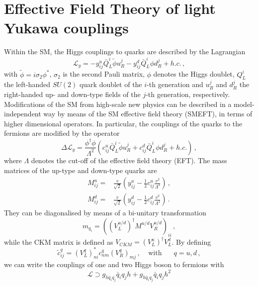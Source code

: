 \section{Effective Field Theory of light Yukawa couplings\label{sec:EFT}}
Within the SM, the Higgs couplings to quarks are described by the Lagrangian
\begin{equation}
	\mathcal{L}_{y}=-y^u_{ij} \bar{Q}_L^i \tilde{\phi} u_R^j - y^d_{ij} \bar{Q}_L^i \phi d_R^j +h.c.\,,
\end{equation}
with $\tilde{\phi}=i \sigma_2 \phi^*$, $\sigma_2$ is the second Pauli matrix, $\phi$ denotes the Higgs doublet, $Q_L^i$ the left-handed $SU(2)$ quark doublet of the $i$-th generation and $u_R^j$ and $d_R^j$ the right-handed up- and down-type fields of the $j$-th generation, respectively.
Modifications of the SM from high-scale new physics can be described in a model-independent way by means of the SM effective field theory (SMEFT), in terms of higher dimensional operators.  In particular, the couplings of the quarks to the fermions are modified by the operator
\begin{equation}
	\Delta \mathcal{L}_{y}=\frac{\phi^{\dagger}\phi}{\Lambda^2}\left( c^u_{ij} \bar{Q}_L^i \tilde{\phi} u_R^j + c^d_{ij} \bar{Q}_L^i \phi d_R^j +h.c.\right)\,,
	\label{eq:EFTop}
\end{equation}
where $\Lambda$ denotes the cut-off of the effective field theory (EFT).  The mass matrices of the up-type and down-type quarks are
\begin{align}
	M^u_{ij} =& \frac{v}{\sqrt{2}} \left( y^u_{ij}-\frac{1}{2} c^u_{ij}\frac{v^2}{\Lambda^2}\right)\,,\\
	M^d_{ij} =& \frac{v}{\sqrt{2}} \left( y^d_{ij}-\frac{1}{2} c^d_{ij}\frac{v^2}{\Lambda^2}\right)\,.
\end{align}
They can be diagonalised by means of a bi-unitary transformation
\begin{equation}
	m_{q_i}=\left((V_{L}^{u/d})^{\dagger} M^{u/d} V_R^{u/d}\right)_{ii}\,,
	\label{eq:Diagonalize}
\end{equation}
while the CKM matrix is defined as $V_{CKM}=(V_L^u)^{\dagger} V_L^d$.
By defining
\begin{equation}
	\tilde{c}^{q}_{ij}= \left(V_{L}^{q}\right)^*_{ni}c_{nm}^{q}\left(V_R^{q}\right)_{mj}\, , \; \; \; \;  \text{with } \;\;\;\;\; q = u,d\,,
\end{equation}
we can write the couplings of one and two Higgs boson to fermions with
\begin{equation}
	\mathcal{L}\supset g_{h\bar{q}_i q_j}\bar{q}_i q_j h + g_{h\bar{q}_i q_j}\bar{q}_i q_j h^2
\end{equation}
